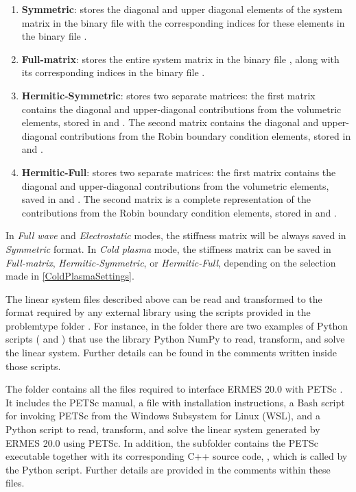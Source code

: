 \begin{enumerate}\itemsep0.5em 
	\item \textbf{Symmetric}: stores the diagonal and upper diagonal elements of the system matrix in the binary file  with the corresponding indices for these elements in the binary file .
	\quad
	\item \textbf{Full-matrix}: stores the entire system matrix in the binary file , along with its corresponding indices in the binary file .
    \quad
	\item \textbf{Hermitic-Symmetric}: stores two separate matrices: the first matrix contains the diagonal and upper-diagonal contributions from the volumetric elements, stored in  and . The second matrix contains the diagonal and upper-diagonal contributions from the Robin boundary condition elements, stored in  and .	
	\quad
	\item \textbf{Hermitic-Full}: stores two separate matrices: the first matrix contains the diagonal and upper-diagonal contributions from the volumetric elements, saved in  and . The second matrix is a complete representation of the contributions from the Robin boundary condition elements, stored in  and .
\end{enumerate}
In \textit{Full wave} and \textit{Electrostatic} modes, the stiffness matrix will be always saved in \textit{Symmetric} format. In \textit{Cold plasma} mode, the stiffness matrix can be saved in \textit{Full-matrix}, \textit{Hermitic-Symmetric}, or \textit{Hermitic-Full}, depending on the selection made in \ref{ColdPlasmaSettings}. 

The linear system files described above can be read and transformed to the format required by any external library using the scripts provided in the problemtype folder . For instance, in the folder  there are two examples of Python scripts ( and ) that use the library Python NumPy \cite{NumPyWeb} to read, transform, and solve the linear system. Further details can be found in the comments written inside those scripts.

The folder  contains all the files required to interface ERMES 20.0 with PETSc \cite{PETScWeb}. It includes the PETSc manual, a  file with installation instructions, a Bash script for invoking PETSc from the Windows Subsystem for Linux (WSL), and a Python script to read, transform, and solve the linear system generated by ERMES 20.0 using PETSc. In addition, the subfolder  contains the PETSc executable together with its corresponding C++ source code, , which is called by the Python script. Further details are provided in the comments within these files.